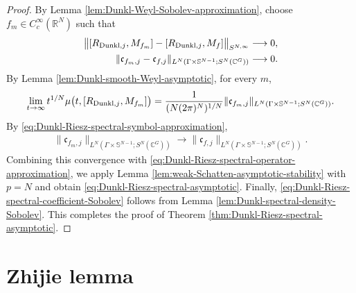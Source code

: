 \documentclass{amsart}
\begin{document}
\begin{proof}
By Lemma \ref{lem:Dunkl-Weyl-Sobolev-approximation}, choose
\(f_m\in C_c^\infty(\mathbb R^N)\) such that
\begin{align}
\big\|
[R_{{\rm Dunkl},j},M_{f_m}]
-
[R_{{\rm Dunkl},j},M_f]
\big\|_{S^{N,\infty}}
&\longrightarrow0,
\label{eq:Dunkl-Riesz-spectral-operator-approximation}\\
\|\mathfrak c_{f_m,j}-\mathfrak c_{f,j}\|_
{L^N(\Gamma\times\mathbb S^{N-1};S^N(\mathbb C^G))}
&\longrightarrow0.
\label{eq:Dunkl-Riesz-spectral-symbol-approximation}
\end{align}
By Lemma \ref{lem:Dunkl-smooth-Weyl-asymptotic}, for every \(m\),
\begin{align*}
\lim_{t\to\infty}
t^{1/N}
\mu
\big(
t,[R_{{\rm Dunkl},j},M_{f_m}]
\big)
=
\frac{1}{(N(2\pi)^N)^{1/N}}
\|\mathfrak c_{f_m,j}\|_
{L^N(\Gamma\times\mathbb S^{N-1};S^N(\mathbb C^G))}.
\end{align*}
By \eqref{eq:Dunkl-Riesz-spectral-symbol-approximation},
\begin{align*}
\|\mathfrak c_{f_m,j}\|_
{L^N(\Gamma\times\mathbb S^{N-1};S^N(\mathbb C^G))}
\longrightarrow
\|\mathfrak c_{f,j}\|_
{L^N(\Gamma\times\mathbb S^{N-1};S^N(\mathbb C^G))}.
\end{align*}
Combining this convergence with
\eqref{eq:Dunkl-Riesz-spectral-operator-approximation}, we apply
Lemma \ref{lem:weak-Schatten-asymptotic-stability} with \(p=N\) and obtain
\eqref{eq:Dunkl-Riesz-spectral-asymptotic}. Finally,
\eqref{eq:Dunkl-Riesz-spectral-coefficient-Sobolev} follows from
Lemma \ref{lem:Dunkl-spectral-density-Sobolev}. This completes the proof of
Theorem \ref{thm:Dunkl-Riesz-spectral-asymptotic}.
\end{proof}


\appendix

\section{Zhijie lemma}
\setcounter{equation}{0}
\end{document}
